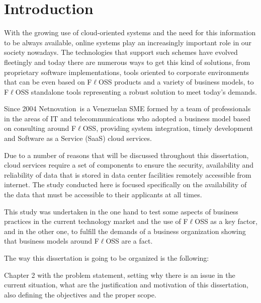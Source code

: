 \documentclass[a4paper, 12pt]{book}
\begin{document}
%
\tableofcontents  	%
\listoffigures  	%
\listoftables 		%

%
\chapter{Introduction}
\label{chap:introduction}

\noindent With the growing use of cloud-oriented systems and the need for this information to be always available, online systems play an increasingly important role in our society nowadays. The technologies that support such schemes have evolved fleetingly and today there are numerous ways to get this kind of solutions, from proprietary software implementations, tools oriented to corporate environments that can be even based on F$\ell$OSS products and a variety of business models, to F$\ell$OSS standalone tools representing a robust solution to meet today's demands.\bigskip

\noindent Since 2004 Netnovation\texttrademark \ is a Venezuelan SME formed by a team of professionals in the areas of IT and telecommunications who adopted a business model based on consulting around F$\ell$OSS, providing system integration, timely development and Software as a Service (SaaS) cloud services.\bigskip

\noindent Due to a number of reasons that will be discussed throughout this dissertation, cloud services require a set of components to ensure the security, availability and reliability of data that is stored in data center facilities remotely accessible from internet. The study conducted here is focused specifically on the availability of the data that must be accessible to their applicants at all times.\bigskip

\noindent This study was undertaken in the one hand to test some aspects of business practices in the current technology market and the use of F$\ell$OSS as a key factor, and in the other one, to fulfill the demands of a business organization showing that business models around F$\ell$OSS are a fact.\bigskip

\noindent The way this dissertation is going to be organized is the following:\bigskip

\noindent Chapter 2 with the problem statement, setting why there is an issue in the current situation, what are the justification and motivation of this dissertation, also defining the objectives and the proper scope.\bigskip
\end{document}
